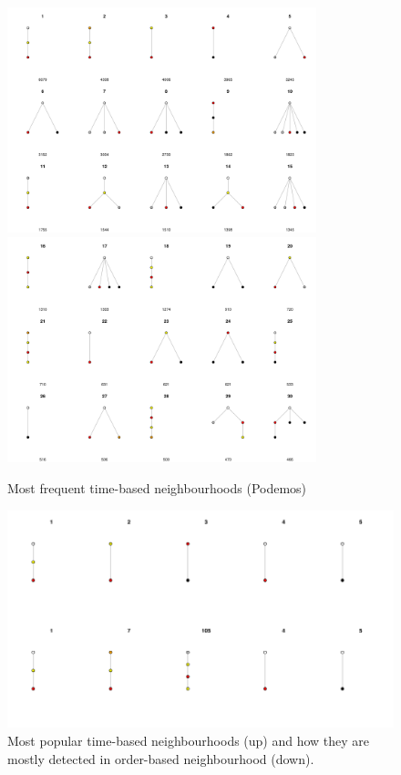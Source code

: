 \documentclass[conference]{IEEEtran}
\begin{document}
\begin{figure}
	\centering
	\includegraphics[width=0.8\textwidth]{census_timebased_1}
	\includegraphics[width=0.8\textwidth]{census_timebased_2}
	\caption{Most frequent time-based neighbourhoods (Podemos)}
	\label{fig:neighbourhoods_time}
\end{figure}

\begin{figure}
\centering
\includegraphics[width=1\textwidth]{confusion_time_order_motifs_gameofthrones_1}
\caption{Most popular time-based neighbourhoods (up) and how they are mostly detected in order-based neighbourhood (down).}
\label{fig:census_size_vs_freq}
\end{figure}


\end{document}
